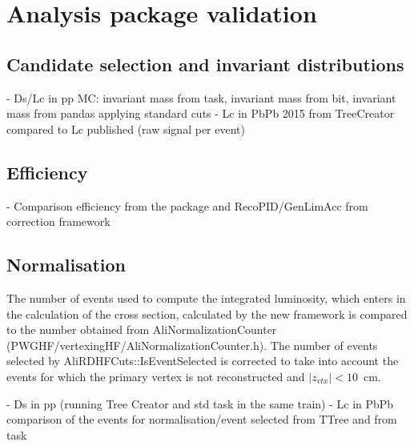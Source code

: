 \section{Analysis package validation}
\label{sec:validation}

\subsection{Candidate selection and invariant distributions}
\label{subsec:invMassValidation}

- Ds/Lc in pp MC: invariant mass from task, invariant mass from bit, invariant mass from pandas applying standard cuts
- Lc in PbPb 2015 from TreeCreator compared to Lc published (raw signal per event)

\subsection{Efficiency}
\label{subsec:effValidation}

- Comparison efficiency from the package and RecoPID/GenLimAcc from correction framework

\subsection{Normalisation}
\label{subsec:normValidation}

The number of events used to compute the integrated luminosity, which enters in the calculation of the cross section, calculated by the new framework is compared to the number obtained from AliNormalizationCounter (PWGHF/vertexingHF/AliNormalizationCounter.h). The number of events selected by AliRDHFCuts::IsEventSelected is corrected to take into account the events for which the primary vertex is not reconstructed and $|z_{vtx}|<10$~cm. 
 
- Ds in pp (running Tree Creator and std task in the same train)
- Lc in PbPb comparison of the events for normalisation/event selected from TTree and from task
